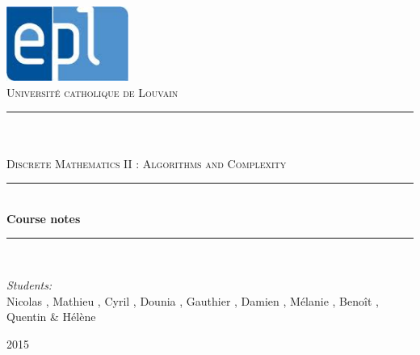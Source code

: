 \newcommand{\HRule}{\rule{\linewidth}{0.5mm}}

\begin{titlepage}
	
\begin{center}

\includegraphics[width=0.30\textwidth]{epl.jpg}\\[1cm]    

\textsc{\LARGE Universit\'e catholique de Louvain}\\[1.5cm]

\HRule \\[0.5cm]

\textsc{\Large {}}\\[0.2cm]
\textsc{\Large Discrete Mathematics II : Algorithms and Complexity}\\[0.5cm]


\HRule \\[2cm]
{\huge \bfseries Course notes}\\[1cm]

\HRule \\[1.5cm]

\begin{minipage}{0.8\textwidth}
\begin{flushleft} \large
\emph{Students:}\\
Nicolas , Mathieu , Cyril , Dounia , Gauthier , Damien , M\'elanie , Beno\^it , Quentin   \& H\'el\`ene 
\emph{}



\end{flushleft}
\end{minipage}


\vfill

{\large  2015}

\end{center}	
	
	
\end{titlepage}